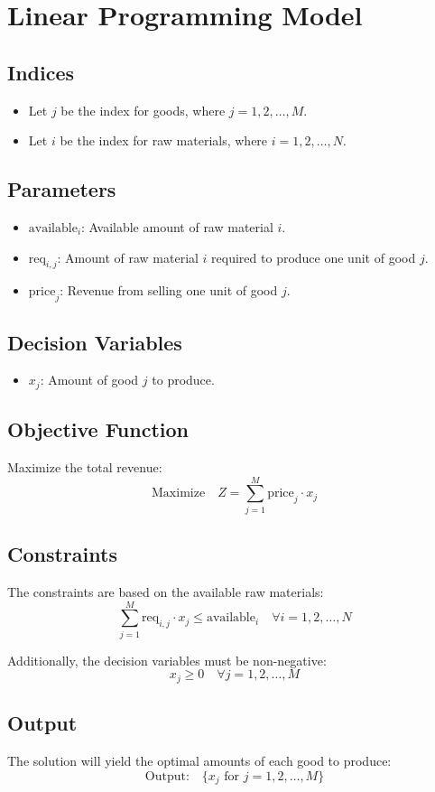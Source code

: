 \documentclass{article}
\begin{document}
\section*{Linear Programming Model}

\subsection*{Indices}
\begin{itemize}
    \item Let \( j \) be the index for goods, where \( j = 1, 2, \ldots, M \).
    \item Let \( i \) be the index for raw materials, where \( i = 1, 2, \ldots, N \).
\end{itemize}

\subsection*{Parameters}
\begin{itemize}
    \item \( \text{available}_i \): Available amount of raw material \( i \).
    \item \( \text{req}_{i,j} \): Amount of raw material \( i \) required to produce one unit of good \( j \).
    \item \( \text{price}_j \): Revenue from selling one unit of good \( j \).
\end{itemize}

\subsection*{Decision Variables}
\begin{itemize}
    \item \( x_j \): Amount of good \( j \) to produce.
\end{itemize}

\subsection*{Objective Function}
Maximize the total revenue:
\[
\text{Maximize} \quad Z = \sum_{j=1}^{M} \text{price}_j \cdot x_j
\]

\subsection*{Constraints}
The constraints are based on the available raw materials:
\[
\sum_{j=1}^{M} \text{req}_{i,j} \cdot x_j \leq \text{available}_i \quad \forall i = 1, 2, \ldots, N
\]

Additionally, the decision variables must be non-negative:
\[
x_j \geq 0 \quad \forall j = 1, 2, \ldots, M
\]

\subsection*{Output}
The solution will yield the optimal amounts of each good to produce:
\[
\text{Output:} \quad \{ x_j \text{ for } j = 1, 2, \ldots, M \}
\]
\end{document}
